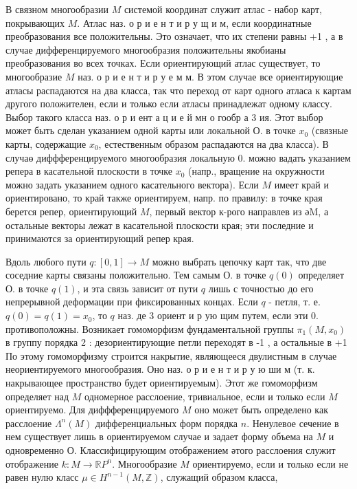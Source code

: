 \documentclass[10pt]{article}
\begin{document}
В связном многообразии $M$ системой координат служит атлас - набор карт, покрывающих $M$. Атлас наз. о р и е н т и р у щ и м, если координатные преобразования все положительны. Это означает, что их степени равны +1 , а в случае дифференцируемого многообразия положительны якобианы преобразования во всех точках. Если ориентирующий атлас существует, то многообразие $M$ наз. о р и е н т и р у е м м. В этом случае все ориентирующие атласы распадаются на два класса, так что переход от карт одного атласа к картам другого положителен, если и только если атласы принадлежат одному классу. Выбор такого класса наз. о р и ент а ц и е й мн о гообр а 3 ия. Этот выбор может быть сделан указанием одной карты или локальной О. в точке $x_{0}$ (связные карты, содержащие $x_{0}$, естественным образом распадаются на два класса). В случаө диффференцируемого многообразия локальную 0. можно вадать указанием репера в касательной плоскости в точке $x_{0}$ (напр., вращение на окружности можно задать указанием одного касательного вектора). Если $M$ имеет край и ориентировано, то край также ориентируем, напр. по правилу: в точке края берется репер, ориентирующий $M$, первый вектор к-рого направлев из әM, а остальные векторы лежат в касательной плоскости края; эти последние и принимаются за ориентирующий репер края.



Вдоль любого пути $q:[0,1] \rightarrow M$ можно выбрать цепочку карт так, что две соседние карты связаны положительно. Тем самым О. в точке $q(0)$ определяет О. в точке $q(1)$, и эта связь зависит от пути $q$ лишь с точностью до его непрерывной деформации при фиксированных концах. Если $q$ - петля, т. е. $q(0)=q(1)=x_{0}$, то $q$ наз. де 3 ориент и р ую щим путем, если эти 0. противоположны. Возникает гомоморфизм фундаментальной группы $\pi_{1}\left(M, x_{0}\right)$ в группу порядка 2 : дезориентирующие петли переходят в -1 , а остальные в +1 По этому гомоморфизму строится накрытие, являющееся двулистным в случае неориентируемого многообразия. Оно наз. о р и е н т и р у ю ши м (т. к. накрывающее пространство будет ориентируемым). Этот же гомоморфизм определяет над $M$ одномерное расслоение, тривиальное, если и только если $M$ ориентируемо. Для диффференцируемого $M$ оно может быть определено как расслоение $\Lambda^{n}(M)$ дифференциальных форм порядка $n$. Ненулевое сечение в нем существует лишь в ориентируемом случае и задает форму объема на $M$ и одновременно О. Классифицирующим отображением әтого расслоения служит отображение $k: M \rightarrow \mathbb{R} P^{n}$. Многообразие $M$ ориентируемо, если и только если не равен нулю класс $\mu \in H^{n-1}(M, \mathbb{Z})$, служащий образом класса,
\end{document}
